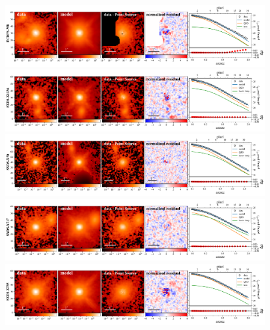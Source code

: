 \documentclass[apj]{emulateapj}
\begin{document}
\begin{figure}
\centering
{
\includegraphics[height=0.25\textwidth]{fig/best_fit_ECDFS-358_SB_profile.pdf}
\includegraphics[height=0.25\textwidth]{fig/best_fit_SXDS-X1136_SB_profile.pdf}
\includegraphics[height=0.25\textwidth]{fig/best_fit_SXDS-X50_SB_profile.pdf}
\includegraphics[height=0.25\textwidth]{fig/best_fit_SXDS-X717_SB_profile.pdf}
\includegraphics[height=0.25\textwidth]{fig/best_fit_SXDS-X735_SB_profile.pdf}
}
\end{figure} 
\end{document}
